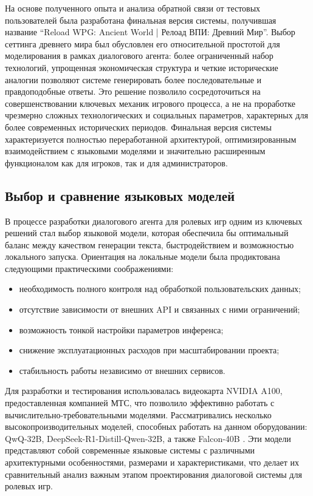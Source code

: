 На основе полученного опыта и анализа обратной связи от тестовых пользователей была разработана финальная версия системы, получившая название ``Reload WPG: Ancient World | Релоад ВПИ: Древний Мир''. Выбор сеттинга древнего мира был обусловлен его относительной простотой для моделирования в рамках диалогового агента: более ограниченный набор технологий, упрощенная экономическая структура и четкие исторические аналогии позволяют системе генерировать более последовательные и правдоподобные ответы. Это решение позволило сосредоточиться на совершенствовании ключевых механик игрового процесса, а не на проработке чрезмерно сложных технологических и социальных параметров, характерных для более современных исторических периодов. Финальная версия системы характеризуется полностью переработанной архитектурой, оптимизированным взаимодействием с языковыми моделями и значительно расширенным функционалом как для игроков, так и для администраторов.

\subsection{Выбор и сравнение языковых моделей}
В процессе разработки диалогового агента для ролевых игр одним из ключевых решений стал выбор языковой модели, которая обеспечила бы оптимальный баланс между качеством генерации текста, быстродействием и возможностью локального запуска. Ориентация на локальные модели была продиктована следующими практическими соображениями:
\begin{itemize}
\item необходимость полного контроля над обработкой пользовательских данных;
\item отсутствие зависимости от внешних API и связанных с ними ограничений;
\item возможность тонкой настройки параметров инференса;
\item снижение эксплуатационных расходов при масштабировании проекта;
\item стабильность работы независимо от внешних сервисов.
\end{itemize}

Для разработки и тестирования использовалась видеокарта NVIDIA A100, предоставленная компанией МТС, что позволило эффективно работать с вычислительно-требовательными моделями. Рассматривались несколько высокопроизводительных моделей, способных работать на данном оборудовании: QwQ-32B, DeepSeek-R1-Distill-Qwen-32B, а также Falcon-40B \cite{reddit_a100}. Эти модели представляют собой современные языковые системы с различными архитектурными особенностями, размерами и характеристиками, что делает их сравнительный анализ важным этапом проектирования диалоговой системы для ролевых игр.
